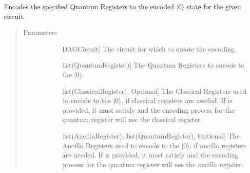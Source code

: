 \documentclass[letterpaper,10pt,english]{sphinxmanual}
\begin{document}
\begin{fulllineitems}
\begin{fulllineitems}
\label{\detokenize{Steane:Steane.SteaneEncoder.getEncoderCircuit}}
\sphinxAtStartPar
Encodes the specified Quantum Registers to the encoded \(|0\rangle\) state for the given circuit.
\begin{quote}\begin{description}
\item[{Parameters}] \leavevmode\begin{description}
\item[{}] \leavevmode{[}DAGCircuit{]}
\sphinxAtStartPar
The circuit for which to create the encoding.

\item[{}] \leavevmode{[}list(QuantumRegister){]}
\sphinxAtStartPar
The Quantum Registers to encode to the \(|0\rangle\).

\item[{}] \leavevmode{[}list(ClassicalRegister), Optional{]}
\sphinxAtStartPar
The Classical Registers used to encode to the \(|0\rangle\), if classical registers are needed. If  is provided, it must satisfy  and the encoding process for the  quantum register will use the  classical register.

\item[{}] \leavevmode{[}list(AncillaRegister), list(QuantumRegister), Optional{]}
\sphinxAtStartPar
The Ancilla Registers used to encode to the \(|0\rangle\), if ancilla registers are needed. If  is provided, it must satisfy  and the encoding process for the  quantum register will use the  ancilla register.

\end{description}

\end{description}\end{quote}


\end{fulllineitems}
\end{fulllineitems}
\end{document}
